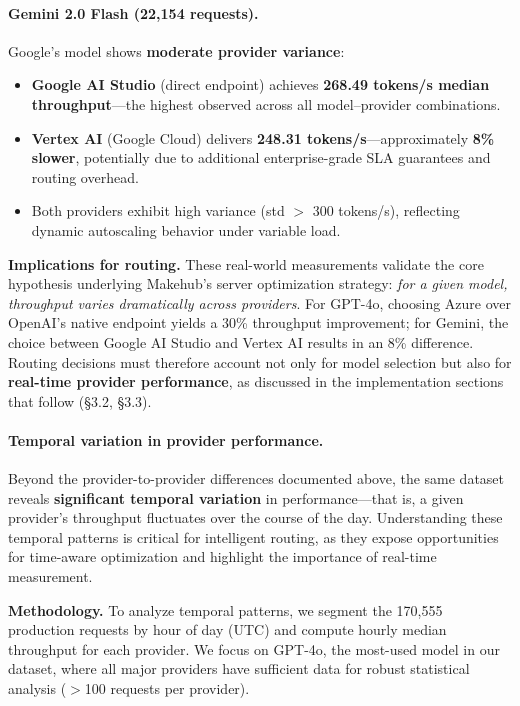 \documentclass[english]{article}
\begin{document}
\paragraph{Gemini 2.0 Flash (22,154 requests).} Google's model shows \textbf{moderate provider variance}:
\begin{itemize}
    \item \textbf{Google AI Studio} (direct endpoint) achieves \textbf{268.49 tokens/s median throughput}—the highest observed across all model–provider combinations.
    \item \textbf{Vertex AI} (Google Cloud) delivers \textbf{248.31 tokens/s}—approximately \textbf{8\% slower}, potentially due to additional enterprise-grade SLA guarantees and routing overhead.
    \item Both providers exhibit high variance (std $>$ 300 tokens/s), reflecting dynamic autoscaling behavior under variable load.
\end{itemize}

\medskip

\noindent\textbf{Implications for routing.} These real-world measurements validate the core hypothesis underlying Makehub's server optimization strategy: \emph{for a given model, throughput varies dramatically across providers}. For GPT-4o, choosing Azure over OpenAI's native endpoint yields a 30\% throughput improvement; for Gemini, the choice between Google AI Studio and Vertex AI results in an 8\% difference. Routing decisions must therefore account not only for model selection but also for \textbf{real-time provider performance}, as discussed in the implementation sections that follow (§3.2, §3.3).

\paragraph{Temporal variation in provider performance.}

Beyond the provider-to-provider differences documented above, the same dataset reveals \textbf{significant temporal variation} in performance—that is, a given provider's throughput fluctuates over the course of the day. Understanding these temporal patterns is critical for intelligent routing, as they expose opportunities for time-aware optimization and highlight the importance of real-time measurement.

\medskip

\noindent\textbf{Methodology.} To analyze temporal patterns, we segment the 170,555 production requests by hour of day (UTC) and compute hourly median throughput for each provider. We focus on GPT-4o, the most-used model in our dataset, where all major providers have sufficient data for robust statistical analysis ($>$100 requests per provider).
\end{document}
